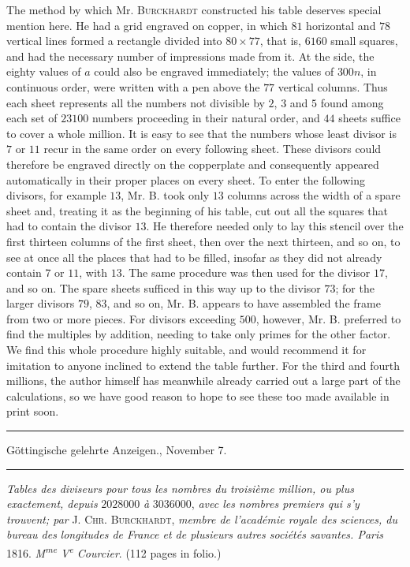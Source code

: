 The method by which Mr. \textsc{Burckhardt} constructed his table deserves special mention here. He had a grid engraved on copper, in which $81$ horizontal and $78$ vertical lines formed a rectangle divided into $80\times77$, that is, $6160$ small squares, and had the necessary number of impressions made from it. At the side, the eighty values
of $a$ could also be engraved immediately; the values of $300n$, in continuous order, were written with a pen above the $77$ vertical columns. Thus each sheet represents all the numbers not divisible by $2$, $3$ and $5$ found among each set of $23100$ numbers proceeding in their natural order, and $44$ sheets suffice to cover a whole million. It is easy to see that the numbers whose least divisor is $7$ or $11$ recur in the same order on every following sheet. These divisors could therefore be engraved directly on the copperplate and consequently appeared automatically in their proper places on every sheet. To enter the following divisors, for example $13$, Mr. B. took only $13$ columns across the width of a spare sheet and, treating it as the beginning of his table, cut out all the squares that had to contain the divisor $13$. He therefore needed only to lay this stencil over the first thirteen columns of the first sheet, then over the next thirteen, and so on, to see at once all the places that had to be filled, insofar as they did not already contain $7$ or $11$, with $13$. The same procedure was then used for the divisor $17$, and so on. The spare sheets sufficed in this way up to the divisor $73$; for the larger divisors $79$, $83$, and so on, Mr. B. appears to have assembled the frame from two or more pieces. For divisors exceeding $500$, however, Mr. B. preferred to find the multiples by addition, needing to take only primes for the other factor. We find this whole procedure highly suitable, and would recommend it for imitation to anyone inclined to extend the table further. For the third and fourth millions, the author himself has meanwhile already carried out a large part of the calculations, so we have good reason to hope to see these too made available in print soon.

\begin{center}
\rule{.86\linewidth}{.3pt}\par
Göttingische gelehrte Anzeigen., November 7.\par
\rule{.86\linewidth}{.3pt}
\end{center}
\emph{Tables des diviseurs pour tous les nombres du troisième million, ou plus exactement, depuis} $2028000$ \emph{à} $3036000$, \emph{avec les nombres premiers qui s'y trouvent; par} \textsc{J. Chr. Burckhardt}, \emph{membre de l'académie royale des sciences, du bureau des }
\emph{longitudes de France et de plusieurs autres sociétés savantes. Paris} 1816. \emph{M\textsuperscript{me} V\textsuperscript{e} Courcier}. (112 pages in folio.)

